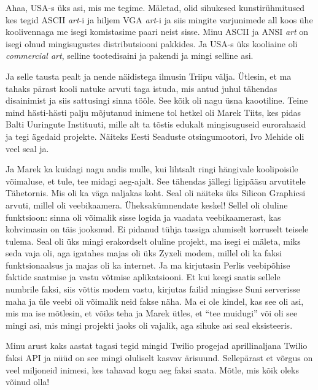 Ahaa, USA-s üks asi, mis me tegime. Mäletad, olid sihukesed kunstirühmitused 
kes tegid ASCII \emph{art}-i ja hiljem VGA \emph{art}-i ja siis mingite 
varjunimede all koos ühe koolivennaga me isegi komistasime paari neist sisse. 
Minu ASCII ja ANSI \emph{art} on isegi olnud mingisugustes distributsiooni 
pakkides. Ja USA-s üks kooliaine oli \emph{commercial art},  selline 
tootedisaini ja pakendi ja mingi selline asi. 

Ja selle tausta pealt ja nende näidistega ilmusin  Triipu välja. Ütlesin, et ma 
tahaks pärast kooli natuke arvuti taga istuda, mis antud juhul tähendas 
disainimist ja siis sattusingi sinna tööle.  See kõik oli nagu üsna kaootiline. 
Teine mind hästi-hästi palju mõjutanud inimene tol hetkel oli Marek 
Tiits,  kes pidas Balti Uuringute 
Instituuti, mille alt ta tõstis edukalt 
mingisuguseid eurorahasid ja tegi ägedaid projekte. Näiteks Eesti Seaduste 
otsingumootori, Ivo Mehide oli veel seal ja. 

Ja Marek ka kuidagi nagu andis mulle, kui lihtsalt  ringi hängivale 
koolipoisile võimaluse, et tule, tee midagi aeg-ajalt. See tähendas jällegi 
ligipääsu arvutitele Tähetornis. Mis oli ka väga naljakas 
koht. Seal oli näiteks üks Silicon Graphicsi 
arvuti, millel oli veebikaamera. Üheksakümnendate keskel! Sellel oli oluline 
funktsioon: sinna oli võimalik sisse logida ja vaadata veebikaamerast, kas 
kohvimasin on täis jooksnud. Ei pidanud tühja tassiga alumiselt korruselt 
teisele tulema. Seal oli üks mingi erakordselt oluline projekt, ma isegi  ei 
mäleta, miks seda vaja oli, aga igatahes majas oli üks Zyxeli modem, 
millel oli ka faksi funktsionaalsus ja  majas oli ka internet.   Ja ma 
kirjutasin Perlis veebipõhise faktide saatmise ja vastu 
võtmise aplikatsiooni. Et kui keegi saatis sellele numbrile faksi, siis võttis 
modem vastu, kirjutas failid mingisse Suni serverisse maha ja üle veebi oli 
võimalik neid fakse näha. Ma ei ole kindel, kas see oli asi, mis ma ise 
mõtlesin, et võiks teha ja Marek ütles, et \enquote{tee muidugi} või oli see 
mingi asi, mis mingi projekti jaoks oli vajalik, aga sihuke asi seal 
eksisteeris.


Minu arust kaks aastat tagasi 
tegid mingid Twilio progejad aprillinaljana Twilio faksi API ja 
nüüd on see mingi oluliselt kasvav ärisuund. Sellepärast et võrgus on veel 
miljoneid inimesi, kes tahavad kogu aeg faksi saata. Mõtle, mis kõik oleks 
võinud olla! 

